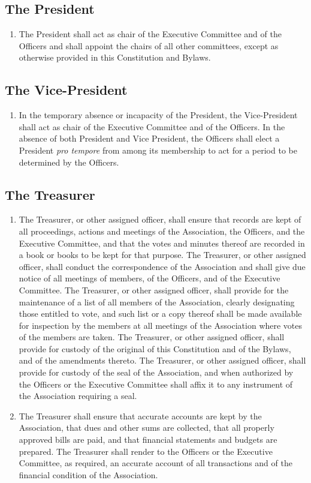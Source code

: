 \subsection{The President}
\begin{enumerate}
	\item The President shall act as chair of the Executive Committee and of the Officers and shall appoint the chairs of all other committees, except as otherwise provided in this Constitution and Bylaws.
\end{enumerate}

\subsection{The Vice-President}
\begin{enumerate}
	\item In the temporary absence or incapacity of the President, the Vice-President shall act as chair of the Executive Committee and of the Officers. In the absence of both President and Vice President, the Officers shall elect a President \textit{pro tempore} from among its membership to act for a period to be determined by the Officers.
\end{enumerate}

\subsection{The Treasurer}
\begin{enumerate}
	\item The Treasurer, or other assigned officer, shall ensure that records are kept of all proceedings, actions and meetings of the Association, the Officers, and the Executive Committee, and that the votes and minutes thereof are recorded in a book or books to be kept for that purpose. The Treasurer, or other assigned officer, shall conduct the correspondence of the Association and shall give due notice of all meetings of members, of the Officers, and of the Executive Committee. The Treasurer, or other assigned officer, shall provide for the maintenance of a list of all members of the Association, clearly designating those entitled to vote, and such list or a copy thereof shall be made available for inspection by the members at all meetings of the Association where votes of the members are taken. The Treasurer, or other assigned officer, shall provide for custody of the original of this Constitution and of the Bylaws, and of the amendments thereto. The Treasurer, or other assigned officer, shall provide for custody of the seal of the Association, and when authorized by the Officers or the Executive Committee shall affix it to any instrument of the Association requiring a seal.
	\item The Treasurer shall ensure that accurate accounts are kept by the Association, that dues and other sums are collected, that all properly approved bills are paid, and that financial statements and budgets are prepared. The Treasurer shall render to the Officers or the Executive Committee, as required, an accurate account of all transactions and of the financial condition of the Association.
\end{enumerate}

